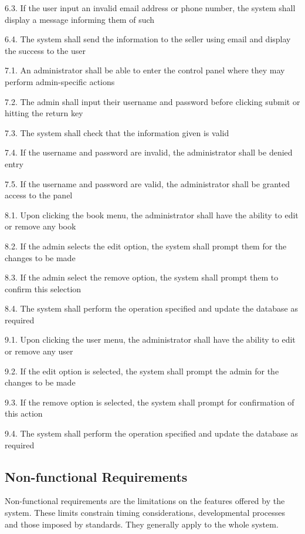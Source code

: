 \documentclass[11pt]{article}
\begin{document}
6.3. If the user input an invalid email address or phone number, the system shall display a message informing them of such

6.4. The system shall send the information to the seller using email and display the success to the user

7.1. An administrator shall be able to enter the control panel where they may perform admin-specific actions

7.2. The admin shall input their username and password before clicking submit or hitting the return key

7.3. The system shall check that the information given is valid

7.4. If the username and password are invalid, the administrator shall be denied entry

7.5. If the username and password are valid, the administrator shall be granted access to the panel

8.1. Upon clicking the book menu, the administrator shall have the ability to edit or remove any book

8.2. If the admin selects the edit option, the system shall prompt them for the changes to be made

8.3. If the admin select the remove option, the system shall prompt them to confirm this selection

8.4. The system shall perform the operation specified and update the database as required

9.1. Upon clicking the user menu, the administrator shall have the ability to edit or remove any user

9.2. If the edit option is selected, the system shall prompt the admin for the changes to be made

9.3. If the remove option is selected, the system shall prompt for confirmation of this action

9.4. The system shall perform the operation specified and update the
database as required

\subsection{Non-functional Requirements}
\label{sec:non-func-reqs}

Non-functional requirements are the limitations on the features
offered by the system. These limits constrain timing considerations,
developmental processes and those imposed by standards. They generally
apply to the whole system.
\end{document}
